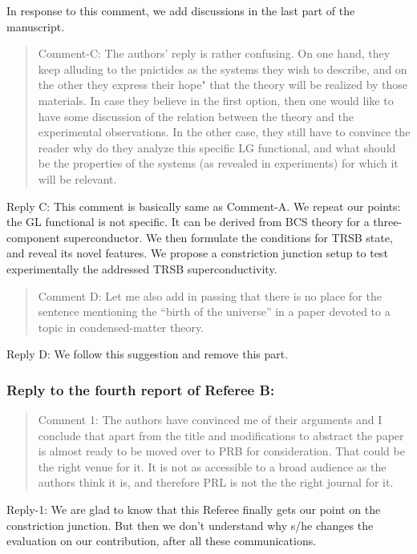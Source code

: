 \documentclass[11pt]{article}
\begin{document}
In response to this comment, we add discussions in the last part of the
manuscript.

\begin{quote}
Comment-C: The authors' reply is rather confusing. On one hand, they
keep alluding to the pnictides as the systems they wish to describe, and
on the other they express their hope" that the theory will be realized
by those materials. In case they believe in the first option, then one
would like to have some discussion of the relation between the theory
and the experimental observations. In the other case, they still have to
convince the reader why do they analyze this specific LG functional, and
what should be the properties of the systems (as revealed in
experiments) for which it will be relevant.
\end{quote}

Reply C: This comment is basically same as Comment-A. We repeat our
points: the GL functional is not specific. It can be derived from BCS
theory for a three-component superconductor. We then formulate the
conditions for TRSB state, and reveal its novel features. We propose a
constriction junction setup to test experimentally the addressed TRSB
superconductivity.

\begin{quote}
Comment D: Let me also add in passing that there is no place for the
sentence mentioning the ``birth of the universe'' in a paper devoted to
a topic in condensed-matter theory.
\end{quote}

Reply D: We follow this suggestion and remove this part.

\hypertarget{reply-to-the-fourth-report-of-referee-b}{%
\subsubsection{Reply to the fourth report of Referee
B:}\label{reply-to-the-fourth-report-of-referee-b}}

\begin{quote}
Comment 1: The authors have convinced me of their arguments and I
conclude that apart from the title and modifications to abstract the
paper is almost ready to be moved over to PRB for consideration. That
could be the right venue for it. It is not as accessible to a broad
audience as the authors think it is, and therefore PRL is not the the
right journal for it.
\end{quote}

Reply-1: We are glad to know that this Referee finally gets our point on
the constriction junction. But then we don't understand why s/he changes
the evaluation on our contribution, after all these communications.
\end{document}
